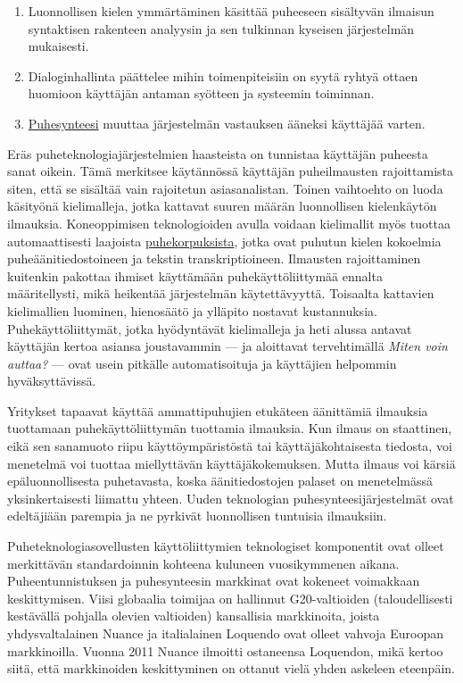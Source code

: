 \documentclass{../../metanetpaper}
\begin{document}
\begin{Parallel}[c]{79mm}{78mm}
{\begin{enumerate}
\item Luonnollisen kielen ymmärtäminen käsittää puheeseen sisältyvän
    ilmaisun syntaktisen rakenteen analyysin ja sen tulkinnan kyseisen
    järjestelmän mukaisesti.

\item Dialoginhallinta päättelee mihin toimenpiteisiin on syytä ryhtyä
    ottaen huomioon käyttäjän antaman syötteen ja systeemin toiminnan.

\item \underline{Puhesynteesi} muuttaa järjestelmän vastauksen
    ääneksi käyttäjää
    varten.

\end{enumerate}
Eräs puheteknologiajärjestelmien haasteista on tunnistaa käyttäjän
puheesta sanat oikein. Tämä merkitsee käytännössä käyttäjän
puheilmausten rajoittamista siten, että se sisältää vain rajoitetun
asiasanalistan. Toinen vaihtoehto on luoda käsityönä kielimalleja,
jotka kattavat suuren määrän luonnollisen kielenkäytön
ilmauksia. Koneoppimisen teknologioiden avulla voidaan kielimallit
myös tuottaa automaattisesti laajoista \underline{puhekorpuksista}, jotka ovat
puhutun kielen kokoelmia puheäänitiedostoineen ja tekstin
transkriptioineen. Ilmausten rajoittaminen kuitenkin pakottaa ihmiset
käyttämään puhekäyttöliittymää ennalta määritellysti, mikä heikentää järjestelmän
käytettävyyttä. Toisaalta kattavien kielimallien luominen, hienosäätö
ja ylläpito nostavat kustannuksia. Puhekäyttöliittymät, jotka hyödyntävät kielimalleja ja
heti alussa antavat käyttäjän kertoa asiansa joustavammin —
ja aloittavat tervehtimällä \textit{Miten voin auttaa?} — ovat usein
pitkälle automatisoituja ja käyttäjien helpommin hyväksyttävissä.

Yritykset tapaavat käyttää ammattipuhujien etukäteen äänittämiä
ilmauksia tuottamaan puhekäyttöliittymän tuottamia ilmauksia. Kun
ilmaus on staattinen, eikä sen sanamuoto riipu käyttöympäristöstä tai
käyttäjäkohtaisesta tiedosta, voi menetelmä voi tuottaa miellyttävän
käyttäjäkokemuksen. Mutta ilmaus voi kärsiä epäluonnollisesta puhetavasta, 
koska äänitiedostojen palaset on menetelmässä yksinkertaisesti liimattu yhteen. 
Uuden teknologian puhesynteesijärjestelmät ovat edeltäjiään parempia ja 
ne pyrkivät luonnollisen tuntuisia ilmauksiin.

Puheteknologiasovellusten käyttöliittymien teknologiset komponentit
ovat olleet merkittävän standardoinnin kohteena kuluneen vuosikymmenen
aikana. Puheentunnistuksen ja puhesynteesin markkinat ovat kokeneet
voimakkaan keskittymisen. Viisi globaalia toimijaa on hallinnut G20-valtioiden 
(taloudellisesti kestävällä pohjalla olevien valtioiden) kansallisia markkinoita, 
joista yhdysvaltalainen Nuance ja italialainen Loquendo ovat olleet vahvoja Euroopan
markkinoilla. Vuonna 2011 Nuance ilmoitti ostaneensa Loquendon, mikä
kertoo siitä, että markkinoiden keskittyminen on ottanut vielä yhden
askeleen eteenpäin.

}
\end{Parallel}
\end{document}

